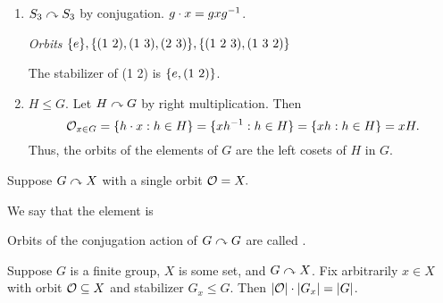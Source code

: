\documentclass[notes.tex]{subfiles}
\begin{document}
\begin{eg}
\begin{enumerate}
\begin{proof}
				Thus, $gx\inv x = x\inv x$ (as $X = G$), so $g = e_G$.
			\end{proof}
		\item
			$S_3\curvearrowright S_3$ by conjugation. $g\cdot x = gx{g}^{-1}$.

			\emph{Orbits} $\{e\}, \{\text{(1 2)}, \text{(1 3)}, \text{(2 3)}\}, \{\text{(1 2 3)}, \text{(1 3 2)}\}$

			The stabilizer of (1 2) is $\{e, \text{(1 2)}\}$.
		\item
			$H\le G$. Let $H\curvearrowright G$ by right multiplication.
			Then
			$$\mathcal{O}_{x\in G} = \{h\cdot x : h\in H\} = \{x{h}^{-1}: h\in H\} = \{xh : h\in H\} = xH.$$
			Thus, the orbits of the elements of $G$ are the left cosets of $H$ in $G$.
	\end{enumerate}
\end{eg}

\begin{defn}
	Suppose $G\curvearrowright X$ with a single orbit $\mathcal{O} = X.$

	We say that the element is 
\end{defn}

\begin{defn}
	Orbits of the conjugation action of $G\curvearrowright G$ are called .
\end{defn}

\begin{theorem}
  \label{OST}
	Suppose $G$ is a finite group, $X$ is some set, and $G\curvearrowright X$. Fix arbitrarily $x\in X$ with orbit $\mathcal{O} \subseteq X$ and stabilizer $G_x \le G.$ Then $|\mathcal{O}|\cdot|G_x| = |G|$.
\end{theorem}
\end{document}
